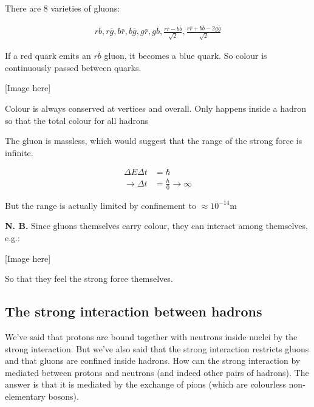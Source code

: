 \documentclass[10pt,a4paper]{article}
\newcommand{\units}[1]{\mathrm{ #1}}
\begin{document}
There are 8 varieties of gluons:

\begin{align*}
r \bar{b}, r \bar{g}, b \bar{r}, b \bar{g}, g \bar{r}, g \bar{b}, \frac{r \bar{r} - b \bar{b}}{\sqrt{2}}, \frac{r \bar{r} + b \bar{b} - 2 g \bar{g}}{\sqrt{2}}
\end{align*}

If a red quark emits an $r\bar{b}$ gluon, it becomes a blue quark. So colour is continuously passed between quarks.

[Image here]

Colour is always conserved at vertices and overall. Only happens inside a hadron so that the total colour for all hadrons

The gluon is massless, which would suggest that the range of the strong force is infinite.

\begin{align*}
\Delta E \Delta t &= \hbar \\
\rightarrow \Delta t &= \frac{\hbar}{0} \rightarrow \infty
\end{align*}

But the range is actually limited by confinement to $\approx 10^{-14} \units{m}$

\textbf{N. B.} Since gluons themselves carry colour, they can interact among themselves, e.g.:

[Image here]

So that they feel the strong force themselves.

\subsection*{The strong interaction between hadrons}

We've said that protons are bound together with neutrons inside nuclei by the strong interaction. But we've also said that the strong interaction restricts gluons and that gluons are confined inside hadrons. How can the strong interaction by mediated between protons and neutrons (and indeed other pairs of hadrons). The answer is that it is mediated by the exchange of pions (which are colourless non-elementary bosons).
\end{document}
